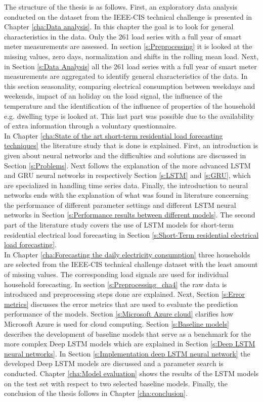 The structure of the thesis is as follows. First, an exploratory data analysis conducted on the dataset from the IEEE-CIS technical challenge is presented in Chapter \ref{cha:Data analysis}. In this chapter the goal is to look for general characteristics in the data. Only the 261 load series with a full year of smart meter measurements are assessed. In section \ref{s:Preprocessing} it is looked at the missing values, zero days, normalization and shifts in the rolling mean load. Next, in Section \ref{s:Data Analysis} all the 261 load series with a full year of smart meter measurements are aggregated to identify general characteristics of the data. In this section seasonality, comparing electrical consumption between weekdays and weekends, impact of an holiday on the load signal, the influence of the temperature and the identification of the influence of properties of the household e.g. dwelling type is looked at. This last part was possible due to the availability of extra information through a voluntary questionnaire.\\
In Chapter \ref{cha:State of the art short-term residential load forecasting techniques} the literature study that is done is explained. First, an introduction is given about neural networks and the difficulties and solutions are discussed in Section \ref{s:Problems}. Next follows the explanation of the more advanced LSTM and GRU neural networks in respectively Section \ref{s:LSTM} and \ref{s:GRU}, which are specialized in handling time series data. Finally, the introduction to neural networks ends with the explanation of what was found in literature concerning the performance of different parameter settings and different LSTM neural networks in Section \ref{s:Performance results between different models}. The second part of the literature study covers the use of LSTM models for short-term residential electrical load forecasting in Section \ref{s:Short-Term residential electrical load forecasting}.\\
In Chapter \ref{cha:Forecasting the daily electricity consumption} three households are selected from the IEEE-CIS technical challenge dataset with the least amount of missing values. The corresponding load signals are used for individual household forecasting. In section \ref{s:Preprocessing_cha4} the raw data is introduced and preprocessing steps done are explained. Next, Section \ref{s:Error metrics} discusses the error metrics that are used to evaluate the prediction performance of the models. Section \ref{s:Microsoft Azure cloud} clarifies how Microsoft Azure is used for cloud computing. Section \ref{s:Baseline models} describes the development of baseline models that serve as a benchmark for the more complex Deep LSTM models which are explained in Section \ref{s:Deep LSTM neural networks}. In Section \ref{s:Implementation deep LSTM neural network} the developed Deep LSTM models are discussed and  a parameter search is conducted. Chapter \ref{cha:Model evaluation} shows the results of the LSTM models on the test set with respect to two selected baseline models. Finally, the conclusion of the thesis follows in Chapter \ref{cha:conclusion}.





